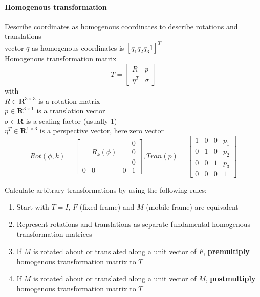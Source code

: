 \documentclass[12pt]{article}
\begin{document}
	\paragraph{Homogenous transformation} Describe coordinates as homogenous coordinates to describe rotations and translations\\
	vector $q$ as homogenous coordinates is $[q_{1} q_{2} q_{3} 1]^T$\\
	Homogenous transformation matrix
	\begin{equation}
	T = 
	\begin{bmatrix}
	R & p\\
	\eta^T & \sigma
	\end{bmatrix}
	\end{equation}
	with\\
	$R \in \mathbf{R}^{3 \times 3}$ is a rotation matrix\\
	$p \in \mathbf{R}^{3 \times 1}$ is a translation vector\\
	$\sigma \in \mathbf{R}$ is a scaling factor (usually 1)\\
	$\eta^T \in \mathbf{R}^{1 \times 3}$ is a perspective vector, here zero vector	\begin{equation}
	Rot(\phi, k) = 
	\begin{bmatrix}
	& & & 0\\
	& R_{k}(\phi) & & 0\\
	& & & 0\\
	0 & 0 & 0 & 1
	\end{bmatrix}, 
	Tran(p) = 
	\begin{bmatrix}
	1 & 0 & 0 & p_{1}\\
	0 & 1 & 0 & p_{2}\\
	0 & 0 & 1 & p_{3}\\
	0 & 0 & 0 & 1
	\end{bmatrix}
	\end{equation}
	
	Calculate arbitrary transformations by using the following rules:
	\begin{enumerate}
		\item Start with $T = I$, $F$ (fixed frame) and $M$ (mobile frame) are equivalent
		\item Represent rotations and translations as separate fundamental homogenous transformation matrices
		\item If $M$ is rotated about or translated along a unit vector of $F$, \textbf{premultiply} homogenous transformation matrix to $T$
		\item If $M$ is rotated about or translated along a unit vector of $M$, \textbf{postmultiply} homogenous transformation matrix to $T$
	\end{enumerate}
\end{document}
